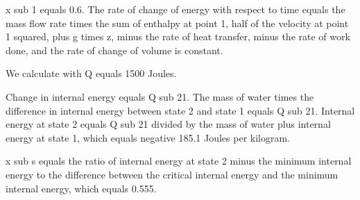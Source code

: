 x sub 1 equals 0.6. The rate of change of energy with respect to time equals the mass flow rate times the sum of enthalpy at point 1, half of the velocity at point 1 squared, plus g times z, minus the rate of heat transfer, minus the rate of work done, and the rate of change of volume is constant.

We calculate with Q equals 1500 Joules.

Change in internal energy equals Q sub 21.
The mass of water times the difference in internal energy between state 2 and state 1 equals Q sub 21.
Internal energy at state 2 equals Q sub 21 divided by the mass of water plus internal energy at state 1, which equals negative 185.1 Joules per kilogram.

x sub s equals the ratio of internal energy at state 2 minus the minimum internal energy to the difference between the critical internal energy and the minimum internal energy, which equals 0.555.